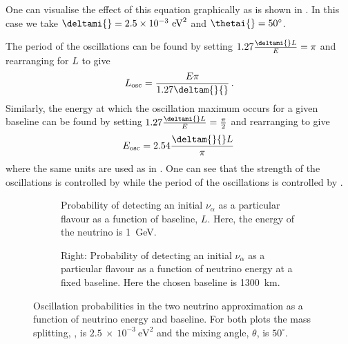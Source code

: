 One can visualise the effect of this equation graphically as is shown in . 
In this case we take $\deltami{} = 2.5 \times 10^{-3}~\text{eV}^{2}$ and $\thetai{} = 50^{\circ}$.

The period of the oscillations can be found by setting $1.27 \frac{\deltami{}L}{E} = \pi$ and rearranging for $L$ to give
\begin{equation}
  L_{\text{osc}} = \frac{E \pi}{1.27 \deltam{}{}} \, .
\end{equation}
Similarly, the energy at which the oscillation maximum occurs for a given baseline can be found by setting $1.27 \frac{\deltami{}L}{E} = \frac{\pi}{2}$ and rearranging to give
\begin{equation}
  E_{\text{osc}} = 2.54 \frac{\deltam{}{} L}{\pi} \,
\end{equation}
where the same units are used as in .
One can see that the strength of the oscillations is controlled by \sstwothetai{} while the period of the oscillations is controlled by \deltami{}.

\begin{figure}[h]
  \centering
  \begin{subfigure}[t]{0.49\textwidth}
    \begin{adjustbox}{max totalsize={\textwidth}, center}
      
    \end{adjustbox}
    \caption{Probability of detecting an initial $\nu_{\alpha}$ as a particular flavour as a function of baseline, $L$. Here, the energy of the neutrino is 1~GeV.}
  \end{subfigure}
  \hfill
  \begin{subfigure}[t]{0.49\textwidth}
    \begin{adjustbox}{max totalsize={\textwidth}, center}
      
    \end{adjustbox}
    \caption{Right: Probability of detecting an initial $\nu_{\alpha}$ as a particular flavour as a function of neutrino energy at a fixed baseline. Here the chosen baseline is 1300~km.}
  \end{subfigure}
  \caption[Two neutrino oscillation probabilities.]{Oscillation probabilities in the two neutrino approximation as a function of neutrino energy and baseline. For both plots the mass splitting, \deltam{}{}, is $2.5~\times~10^{-3}~\text{eV}^{2}$ and the mixing angle, $\theta$, is $50^{\circ}$.}
  \label{fig:twoNeutrino}
\end{figure}

